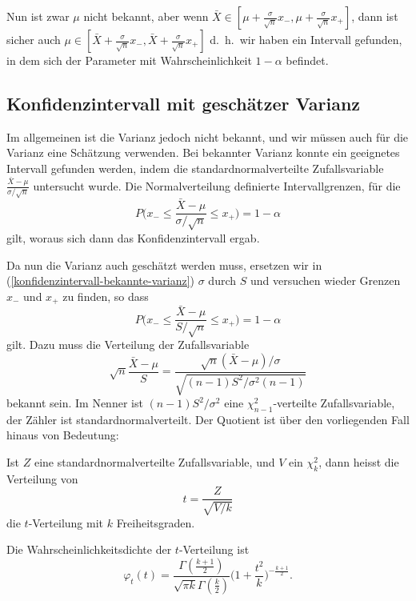 Nun ist zwar $\mu$ nicht bekannt, aber wenn
$\bar X\in[\mu+\frac{\sigma}{\sqrt{n}} x_-,\mu+\frac{\sigma}{\sqrt{n}} x_+]$,
dann ist sicher auch
$\mu\in[\bar X+\frac{\sigma}{\sqrt{n}} x_-,\bar X+\frac{\sigma}{\sqrt{n}} x_+]$
d.~h.~wir haben ein
Intervall gefunden, in dem sich der Parameter mit Wahrscheinlichkeit $1-\alpha$
befindet.

\subsection{Konfidenzintervall mit geschätzer Varianz}
Im allgemeinen ist die Varianz jedoch nicht bekannt, und wir müssen
auch für die Varianz eine Schätzung verwenden.
Bei bekannter Varianz
konnte ein geeignetes Intervall gefunden werden, indem die
standardnormalverteilte Zufallsvariable
$\frac{\bar X-\mu}{\sigma/\sqrt{n}}$
untersucht wurde.
Die Normalverteilung definierte Intervallgrenzen,
für die
\begin{equation}
P\biggl(x_-\le
\frac{\bar X-\mu}{\sigma/\sqrt{n}}
\le x_+\biggr)=1-\alpha
\label{konfidenzintervall-bekannte-varianz}
\end{equation}
gilt, woraus sich dann das Konfidenzintervall ergab.

Da nun die Varianz auch geschätzt werden muss, ersetzen wir in
(\ref{konfidenzintervall-bekannte-varianz})
$\sigma$ durch $S$ und versuchen wieder Grenzen
$x_-$ und $x_+$ zu finden, so dass
\begin{equation}
P\biggl(x_-\le
\frac{\bar X-\mu}{S/\sqrt{n}}
\le x_+\biggr)=1-\alpha
\label{konfidenzintervall-geschaetzte-varianz}
\end{equation}
gilt.
Dazu muss die Verteilung der Zufallsvariable
\begin{equation}
\sqrt{n}\frac{\bar X-\mu}{S}
=\frac{\sqrt{n}(\bar X-\mu)/\sigma}{\sqrt{(n-1)S^2/\sigma^2(n-1)}}
\label{konfidenzintervall-verteilung}
\end{equation}
bekannt sein.
Im Nenner ist $(n-1)S^2/\sigma^2$ eine
$\chi_{n-1}^2$-verteilte Zufallsvariable,
der Zähler ist standardnormalverteilt.
Der Quotient ist über den
vorliegenden Fall hinaus von Bedeutung:

\begin{definition}
Ist $Z$ eine standardnormalverteilte Zufallsvariable, und $V$ ein
$\chi_k^2$, dann heisst die Verteilung von
\[
t=\frac{Z}{\sqrt{V/k}}
\]
die $t$-Verteilung mit $k$ Freiheitsgraden.
\end{definition}

\begin{satz}Die Wahrscheinlichkeitsdichte der $t$-Verteilung ist
\begin{equation}
\varphi_t(t)
=
\frac{\Gamma(\frac{k+1}{2})}{\sqrt{\pi k}\Gamma(\frac{k}2)}
\biggl(1+\frac{t^2}{k}\biggr)^{-\frac{k+1}2}.
\end{equation}
\end{satz}

